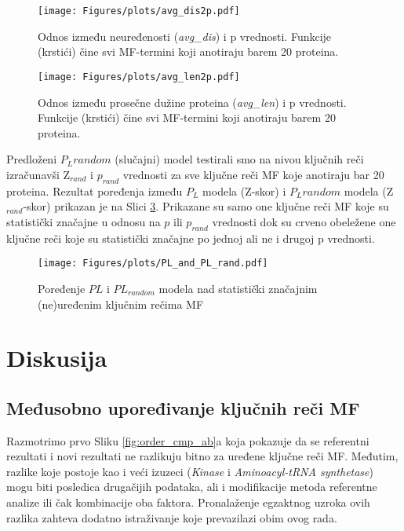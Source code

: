 \begin{figure}[th]
  \centering
\texttt{[image: Figures/plots/avg\_dis2p.pdf]}
\caption {
  Odnos između neuređenosti (\textit{avg\_dis}) i p vrednosti.
  Funkcije (krstići) čine svi MF-termini koji anotiraju barem 20 proteina.
}
\label{fig:avg_dis_vs_p}
\end{figure}

\begin{figure}[th]
  \centering
\texttt{[image: Figures/plots/avg\_len2p.pdf]}
\caption {
  Odnos između prosečne dužine proteina (\textit{avg\_len}) i p vrednosti.
  Funkcije (krstići) čine svi MF-termini koji anotiraju barem 20 proteina.
}
\label{fig:avg_len_vs_p}
\end{figure}



Predloženi $P_L random$ (slučajni) model testirali smo na nivou ključnih reči
izračunavši Z$_{rand}$ i  $p_{rand}$ vrednosti za sve ključne reči MF koje
anotiraju bar 20 proteina. Rezultat poređenja između $P_L$
modela (Z-skor) i $P_L random$ modela (Z$_{rand}$-skor) prikazan je na Slici
\ref{fig:PLrand}. Prikazane su samo one ključne reči MF koje su statistički
značajne u odnosu na $p$ ili $p_{rand}$ vrednosti dok su crveno obeležene one
ključne reči koje su statistički značajne po jednoj ali ne i drugoj p
vrednosti.


\begin{figure}[th]
\hspace*{-2.7cm} 
\centering
\texttt{[image: Figures/plots/PL\_and\_PL\_rand.pdf]}
\caption {
  Poređenje $PL$ i $PL_{random}$ modela nad statistički značajnim (ne)uređenim ključnim rečima MF
}
\label{fig:PLrand}
\end{figure}




\chapter{Diskusija} %

\label{Diskusija} %

\section{Međusobno upoređivanje ključnih reči MF}

Razmotrimo prvo Sliku \ref{fig:order_cmp_ab}a koja pokazuje da se referentni
rezultati i novi rezultati ne razlikuju bitno za uređene ključne
reči MF. Međutim, razlike koje postoje kao i veći izuzeci (\textit{Kinase} i
\textit{Aminoacyl-tRNA synthetase})  mogu biti posledica drugačijih podataka,
ali i modifikacije metoda referentne analize ili čak kombinacije oba faktora.
Pronalaženje egzaktnog uzroka ovih razlika zahteva dodatno istraživanje koje
prevazilazi obim ovog rada.

